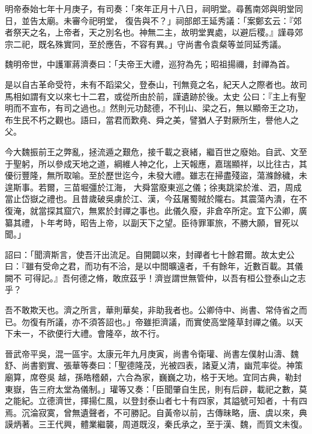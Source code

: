 \begin{pinyinscope}
 明帝泰始七年十月庚子，有司奏：「來年正月十八日，祠明堂。尋舊南郊與明堂同日，並告太廟。未審今祀明堂，
 復告與不？」祠部郎王延秀議：「案鄭玄云：『郊者祭天之名，上帝者，天之別名也。神無二主，故明堂異處，以避后稷。』謹尋郊宗二祀，既名殊實同，至於應告，不容有異。」守尚書令袁粲等並同延秀議。



 魏明帝世，中護軍蔣濟奏曰：「夫帝王大禮，巡狩為先；昭祖揚禰，封禪為首。



 是以自古革命受符，未有不蹈梁父，登泰山，刊無竟之名，紀天人之際者也。故司馬相如謂有文以來七十二君，或從所由於前，謹遺跡於後。太史
 公曰：『主上有聖明而不宣布，有司之過也。』然則元功懿德，不刊山、梁之石，無以顯帝王之功，布生民不朽之觀也。語曰，當君而歎堯、舜之美，譬猶人子對厥所生，譽他人之父。



 今大魏振前王之弊亂，拯流遁之艱危，接千載之衰緒，繼百世之廢始。自武、文至于聖躬，所以參成天地之道，綱維人神之化，上天報應，嘉瑞顯祥，以比往古，其優衍豐隆，無所取喻。至於歷世迄今，未發大禮。雖志在掃盡殘盜，蕩滌餘穢，未遑斯事。若爾，三苗堀彊於江海，
 大舜當廢東巡之儀；徐夷跳梁於淮、泗，周成當止岱嶽之禮也。且昔歲破吳虜於江、漢，今茲屠蜀賊於隴右。其震蕩內潰，在不復淹，就當探其窟穴，無累於封禪之事也。此儀久廢，非倉卒所定。宜下公卿，廣纂其禮，卜年考時，昭告上帝，以副天下之望。臣待罪軍旅，不勝大願，冒死以聞。」



 詔曰：「聞濟斯言，使吾汗出流足。自開闢以來，封禪者七十餘君爾。故太史公曰：『雖有受命之君，而功有不洽，是以中間曠遠者，千有餘年，近數百載。其儀闕不
 可得記。』吾何德之脩，敢庶茲乎！濟豈謂世無管仲，以吾有桓公登泰山之志乎？



 吾不敢欺天也。濟之所言，華則華矣，非助我者也。公卿侍中、尚書、常侍省之而已。勿復有所議，亦不須答詔也。」帝雖拒濟議，而實使高堂隆草封禪之儀。以天下未一，不欲便行大禮。會隆卒，故不行。



 晉武帝平吳，混一區宇。太康元年九月庚寅，尚書令衛瓘、尚書左僕射山濤、魏舒、尚書劉實、張華等奏曰：「聖德隆茂，光被四表，諸夏乂清，幽荒率從。神策廟算，席卷吳
 越，孫皓稽顙，六合為家，巍巍之功，格于天地。宜同古典，勒封東嶽，告三府太堂為儀制。」瓘等又奏：「臣聞肇自生民，則有后辟，載祀之數，莫之能紀。立德濟世，揮揚仁風，以登封泰山者七十有四家，其謚號可知者，十有四焉。沉淪寂寞，曾無遺聲者，不可勝記。自黃帝以前，古傳昧略，唐、虞以來，典謨炳著。三王代興，體業繼襲，周道既沒，秦氏承之，至于漢、魏，而質文未復。




\end{pinyinscope}
